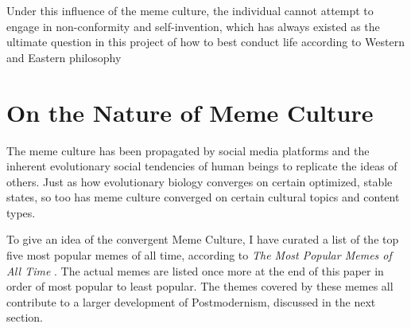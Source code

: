 \documentclass[12pt,letterpaper]{article}
\begin{document}
Under this influence of the meme culture, the individual cannot attempt to engage in non-conformity and self-invention, which has always existed as the ultimate question in this project of how to best conduct life according to Western and Eastern philosophy



%



\section{On the Nature of Meme Culture}
\label{meme}
The meme culture has been propagated by social media platforms and the inherent evolutionary social tendencies of human beings to replicate the ideas of others.  Just as how evolutionary biology converges on certain optimized, stable states, so too has meme culture converged on certain cultural topics and content types.

To give an idea of the convergent Meme Culture, I have curated a list of the top five most popular memes of all time, according to \textit{The Most Popular Memes of All Time} \cite{}.  The actual memes are listed once more at the end of this paper in order of most popular to least popular.  The themes covered by these memes all contribute to a larger development of Postmodernism, discussed in the next section.
\end{document}
